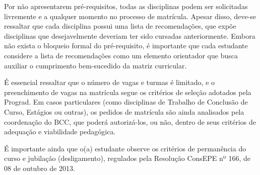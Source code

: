 Por não apresentarem pré-requisitos, todas as disciplinas podem ser solicitadas
livremente e a qualquer momento no processo de matrícula.
Apesar disso, deve-se ressaltar que cada disciplina possui uma lista de
recomendações, que expõe disciplinas que desejavelmente deveriam ter sido
cursadas anteriormente.
Embora não exista o bloqueio formal do pré-requisito, é importante que cada
estudante considere a lista de recomendações como um elemento orientador que
busca auxiliar o cumprimento bem-sucedido da matriz curricular.

É essencial ressaltar que o número de vagas e turmas é limitado, e o
preenchimento de vagas na matrícula segue os critérios de seleção adotados pela
Prograd.
Em casos particulares (como disciplinas de Trabalho de Conclusão de Curso,
Estágios ou outras), os pedidos de matrícula são ainda analisados pela
coordenação do BCC, que poderá autorizá-los, ou não, dentro de seus critérios
de adequação e viabilidade pedagógica.

É importante ainda que o(a) estudante observe os critérios de permanência do
curso e jubilação (desligamento), regulados pela Resolução ConsEPE nº 166, de
08 de outubro de 2013.
